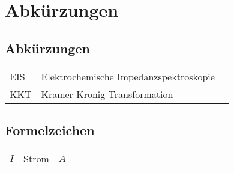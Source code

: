 \chapter{Abkürzungen} \label{abkuerzungen}

\section{Abk\"urzungen} \label{sec:abkuerz}
\begin{longtable}[l]{p{0.2\tw} p{0.5\tw} p{0.1\tw}}
EIS     & Elektrochemische Impedanzspektroskopie                             \\
KKT	  & Kramer-Kronig-Transformation						     \\
\end{longtable}

\section{Formelzeichen} \label{sec:formulaSym}
\begin{longtable}[l]{lll}
$I$             & Strom                          & $A$ \\
\end{longtable}




%

